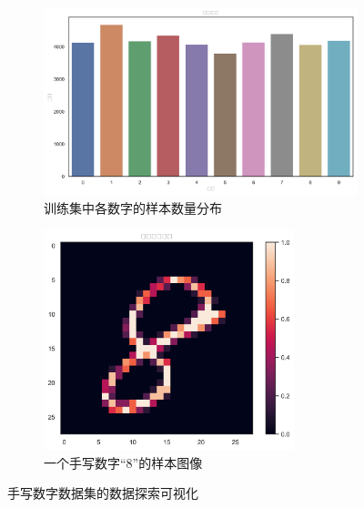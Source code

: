 \begin{itemize}
        \begin{figure}[htbp]
            \centering
            \begin{subfigure}[b]{0.48\textwidth}
                \centering
                \includegraphics[width=\textwidth]{figures/digit_distribution.png}
                \caption{训练集中各数字的样本数量分布}
                \label{fig:digit_distribution}
            \end{subfigure}
            \hfill
            \begin{subfigure}[b]{0.48\textwidth}
                \centering
                \includegraphics[width=0.8\textwidth]{figures/sample_digit.png}
                \caption{一个手写数字“8”的样本图像}
                \label{fig:sample_digit}
            \end{subfigure}
            \caption{手写数字数据集的数据探索可视化}
            \label{fig:digit_exploration}
        \end{figure}


\end{itemize}
